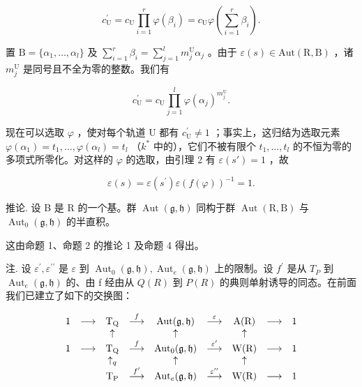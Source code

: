 \[
c _ {\mathrm{U}} ^ {\prime} = c _ {\mathrm{U}} \prod_ {i = 1} ^ {r} \varphi (\beta_ {i}) = c _ {\mathrm{U}} \varphi \left(\sum_ {i = 1} ^ {r} \beta_ {i}\right).
\]

置 \(\mathrm{B} = \{\alpha_1, \ldots, \alpha_l\}\) 及 \(\sum_{i=1}^{r} \beta_i = \sum_{j=1}^{l} m_j^{\mathrm{U}} \alpha_j\) 。由于 \(\varepsilon(s) \in \mathrm{Aut}(\mathrm{R}, \mathrm{B})\) ，诸 \(m_j^{\mathrm{U}}\) 是同号且不全为零的整数。我们有

\[
c _ {\mathrm{U}} ^ {\prime} = c _ {\mathrm{U}} \prod_ {j = 1} ^ {l} \varphi (\alpha_ {j}) ^ {m _ {j} ^ {\mathrm{U}}}.
\]

现在可以选取 \(\varphi\) ，使对每个轨道 U 都有 \(c_{\mathrm{U}}^{\prime} \neq 1\) ；事实上，这归结为选取元素 \(\varphi(\alpha_1) = t_1, \ldots, \varphi(\alpha_l) = t_l\) （\(k^*\) 中的），它们不被有限个 \(t_1, \ldots, t_l\) 的不恒为零的多项式所零化。对这样的 \(\varphi\) 的选取，由引理 2 有 \(\varepsilon(s') = 1\) ，故

\[
\varepsilon (s) = \varepsilon (s ^ {\prime}) \varepsilon (f (\varphi)) ^ {- 1} = 1.
\]

推论. 设 B 是 R 的一个基。群 \(\operatorname{Aut}(\mathfrak{g},\mathfrak{h})\) 同构于群 \(\operatorname{Aut}(\mathrm{R},\mathrm{B})\) 与 \(\operatorname{Aut}_{0}(\mathfrak{g},\mathfrak{h})\) 的半直积。

这由命题 1、命题 2 的推论 1 及命题 4 得出。

注. 设 \(\varepsilon^{\prime},\varepsilon^{\prime\prime}\) 是 \(\varepsilon\) 到 \(\operatorname{Aut}_{0}(\mathfrak{g},\mathfrak{h}),\operatorname{Aut}_{e}(\mathfrak{g},\mathfrak{h})\) 上的限制。设 \(f^{\prime}\) 是从 \(T_{P}\) 到 \(\operatorname{Aut}_{e}(\mathfrak{g},\mathfrak{h})\) 的、由 f 经由从 \(Q(R)\) 到 \(P(R)\) 的典则单射诱导的同态。在前面我们已建立了如下的交换图：

\[
\begin{array}{c c c c c c c c c} 1 & \longrightarrow & \mathrm{T} _ {\mathrm{Q}} & \stackrel {{f}} {{\longrightarrow}} & \mathrm{Aut} (\mathfrak {g}, \mathfrak {h}) & \stackrel {{\varepsilon}} {{\longrightarrow}} & \mathrm{A} (\mathrm{R}) & \longrightarrow & 1 \\ & & \uparrow & & \uparrow & & \uparrow & & \\ 1 & \longrightarrow & \mathrm{T} _ {\mathrm{Q}} & \stackrel {{f}} {{\longrightarrow}} & \mathrm{Aut} _ {0} (\mathfrak {g}, \mathfrak {h}) & \stackrel {{\varepsilon^ {\prime}}} {{\longrightarrow}} & \mathrm{W} (\mathrm{R}) & \longrightarrow & 1 \\ & & \uparrow_ {q} & & \uparrow & & \uparrow & & \\ & & \mathrm{T} _ {\mathrm{P}} & \stackrel {{f ^ {\prime}}} {{\longrightarrow}} & \mathrm{Aut} _ {e} (\mathfrak {g}, \mathfrak {h}) & \stackrel {{\varepsilon^ {\prime \prime}}} {{\longrightarrow}} & \mathrm{W} (\mathrm{R}) & \longrightarrow & 1 \end{array}
\]

